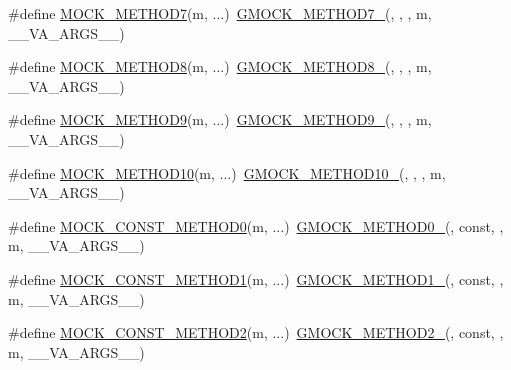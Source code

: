 \begin{DoxyCompactItemize}
\item 
\#define \hyperlink{gmock-generated-function-mockers_8h_a01f3369877a0c52f59c006fbd54b6a10}{M\+O\+C\+K\+\_\+\+M\+E\+T\+H\+O\+D7}(m, ...)~\hyperlink{gmock-generated-function-mockers_8h_ab98a8399ba62b53b375c2807f4d39d2f}{G\+M\+O\+C\+K\+\_\+\+M\+E\+T\+H\+O\+D7\+\_\+}(, , , m, \+\_\+\+\_\+\+V\+A\+\_\+\+A\+R\+G\+S\+\_\+\+\_\+)
\item 
\#define \hyperlink{gmock-generated-function-mockers_8h_ae77220bef9ab254c331b9026a3d18dba}{M\+O\+C\+K\+\_\+\+M\+E\+T\+H\+O\+D8}(m, ...)~\hyperlink{gmock-generated-function-mockers_8h_aa84a36427c44505207b7cad5dec7ad67}{G\+M\+O\+C\+K\+\_\+\+M\+E\+T\+H\+O\+D8\+\_\+}(, , , m, \+\_\+\+\_\+\+V\+A\+\_\+\+A\+R\+G\+S\+\_\+\+\_\+)
\item 
\#define \hyperlink{gmock-generated-function-mockers_8h_ad6b30841fe780994d216cc8829cc127f}{M\+O\+C\+K\+\_\+\+M\+E\+T\+H\+O\+D9}(m, ...)~\hyperlink{gmock-generated-function-mockers_8h_aa820171a19cc587c247dbe05cbffc55f}{G\+M\+O\+C\+K\+\_\+\+M\+E\+T\+H\+O\+D9\+\_\+}(, , , m, \+\_\+\+\_\+\+V\+A\+\_\+\+A\+R\+G\+S\+\_\+\+\_\+)
\item 
\#define \hyperlink{gmock-generated-function-mockers_8h_a01760fdd295f5a92264eed6a9ff1dbf8}{M\+O\+C\+K\+\_\+\+M\+E\+T\+H\+O\+D10}(m, ...)~\hyperlink{gmock-generated-function-mockers_8h_a81a48223a8771de36ef92ac6d56f6e81}{G\+M\+O\+C\+K\+\_\+\+M\+E\+T\+H\+O\+D10\+\_\+}(, , , m, \+\_\+\+\_\+\+V\+A\+\_\+\+A\+R\+G\+S\+\_\+\+\_\+)
\item 
\#define \hyperlink{gmock-generated-function-mockers_8h_ac86e04e649fa8bf35b5f0149a13c935d}{M\+O\+C\+K\+\_\+\+C\+O\+N\+S\+T\+\_\+\+M\+E\+T\+H\+O\+D0}(m, ...)~\hyperlink{gmock-generated-function-mockers_8h_ae0d290ffa58d7c624b2e3487ba1252f4}{G\+M\+O\+C\+K\+\_\+\+M\+E\+T\+H\+O\+D0\+\_\+}(, const, , m, \+\_\+\+\_\+\+V\+A\+\_\+\+A\+R\+G\+S\+\_\+\+\_\+)
\item 
\#define \hyperlink{gmock-generated-function-mockers_8h_a6f76aeb56f492cfe538e177b6aa77965}{M\+O\+C\+K\+\_\+\+C\+O\+N\+S\+T\+\_\+\+M\+E\+T\+H\+O\+D1}(m, ...)~\hyperlink{gmock-generated-function-mockers_8h_a1bc0012d62440dda77208dabdf4925c9}{G\+M\+O\+C\+K\+\_\+\+M\+E\+T\+H\+O\+D1\+\_\+}(, const, , m, \+\_\+\+\_\+\+V\+A\+\_\+\+A\+R\+G\+S\+\_\+\+\_\+)
\item 
\#define \hyperlink{gmock-generated-function-mockers_8h_a31c489715704817a3f40d178404c61e8}{M\+O\+C\+K\+\_\+\+C\+O\+N\+S\+T\+\_\+\+M\+E\+T\+H\+O\+D2}(m, ...)~\hyperlink{gmock-generated-function-mockers_8h_a885295ca6bebb15efb3fc786218c5d47}{G\+M\+O\+C\+K\+\_\+\+M\+E\+T\+H\+O\+D2\+\_\+}(, const, , m, \+\_\+\+\_\+\+V\+A\+\_\+\+A\+R\+G\+S\+\_\+\+\_\+)

\end{DoxyCompactItemize}
